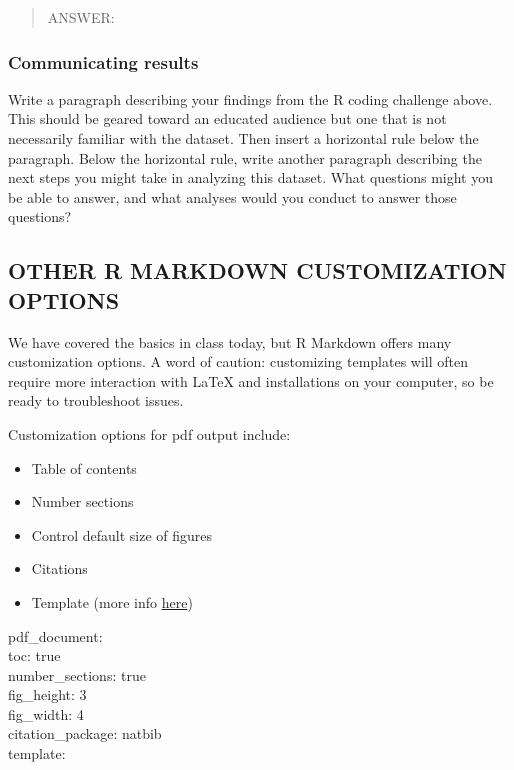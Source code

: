 \documentclass[]{article}
\providecommand{\tightlist}{%
  \setlength{\itemsep}{0pt}\setlength{\parskip}{0pt}}
\begin{document}
\begin{quote}
ANSWER:
\end{quote}

\subsubsection{Communicating results}\label{communicating-results}

Write a paragraph describing your findings from the R coding challenge
above. This should be geared toward an educated audience but one that is
not necessarily familiar with the dataset. Then insert a horizontal rule
below the paragraph. Below the horizontal rule, write another paragraph
describing the next steps you might take in analyzing this dataset. What
questions might you be able to answer, and what analyses would you
conduct to answer those questions?

\subsection{OTHER R MARKDOWN CUSTOMIZATION
OPTIONS}\label{other-r-markdown-customization-options}

We have covered the basics in class today, but R Markdown offers many
customization options. A word of caution: customizing templates will
often require more interaction with LaTeX and installations on your
computer, so be ready to troubleshoot issues.

Customization options for pdf output include:

\begin{itemize}
\tightlist
\item
  Table of contents
\item
  Number sections
\item
  Control default size of figures
\item
  Citations
\item
  Template (more info
  \href{http://jianghao.wang/post/2017-12-08-rmarkdown-templates/}{here})
\end{itemize}

pdf\_document:\\
toc: true\\
number\_sections: true\\
fig\_height: 3\\
fig\_width: 4\\
citation\_package: natbib\\
template:
\end{document}

